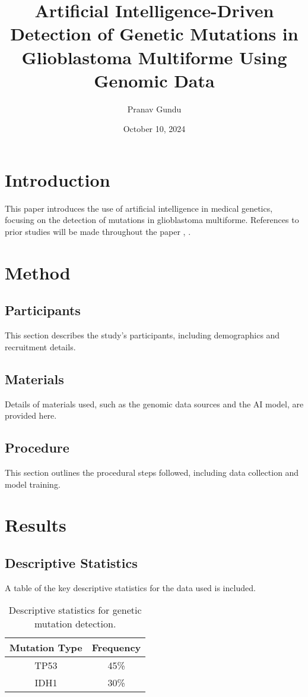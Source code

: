 \documentclass[stu,12pt,floatsintext]{apa7}
\title{Artificial Intelligence-Driven Detection of Genetic Mutations in Glioblastoma Multiforme Using Genomic Data}
\author{Pranav Gundu}
\date{October 10, 2024}
\affiliation{Shrewsbury Public High School}
\begin{document}
\maketitle

\section{Introduction}
This paper introduces the use of artificial intelligence in medical genetics, focusing on the detection of mutations in glioblastoma multiforme. References to prior studies will be made throughout the paper \parencite{Sample2024}, \parencite{FullBook2021}.

\section{Method}
\subsection{Participants}
This section describes the study's participants, including demographics and recruitment details.

\subsection{Materials}
Details of materials used, such as the genomic data sources and the AI model, are provided here.

\subsection{Procedure}
This section outlines the procedural steps followed, including data collection and model training.

\section{Results}
\subsection{Descriptive Statistics}
A table of the key descriptive statistics for the data used is included.

\begin{table}
    \caption{Descriptive statistics for genetic mutation detection.}
    \centering
    \begin{tabular}{cc}
        \hline 
        Mutation Type & Frequency \\
        \hline
        TP53 & 45\% \\
        IDH1 & 30\% \\
        \hline
    \end{tabular}
\end{table}
\end{document}
